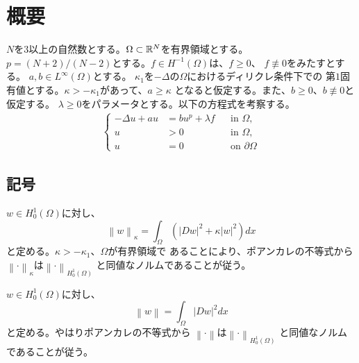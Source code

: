\section{概要}

$N$を$3$以上の自然数とする。$\Omega \subset \mathbb{R}^N$を有界領域とする。
$p = (N+2)/(N-2)$とする。$f \in H^{-1}(\Omega)$は、$f \geq 0$、
$f \not \equiv 0$をみたすとする。
$a, b \in L^\infty(\Omega)$とする。
$\kappa_1$を$-\Delta$の$\Omega$におけるディリクレ条件下での
第$1$固有値とする。$\kappa > - \kappa_1$があって、$a \geq \kappa$
となると仮定する。また、$b \geq 0$、$b \not \equiv 0$と仮定する。
$\lambda \geq 0$をパラメータとする。以下の方程式を考察する。
\begin{align}
 \left\{
 \begin{aligned}
  -\Delta u + a u &= b u^p + \lambda f  & &\text{in~} \Omega,  \\
  u &> 0 & &\text{in~} \Omega, \\
  u &= 0 & &\text{on~} \partial\Omega
 \end{aligned}
 \right. \tag*{$(\star)_\lambda$} \label{eq:prob_main}
\end{align}

\subsection{記号}

$w \in H_0^1(\Omega)$に対し、
\[
 \left\| w \right\|_\kappa = \int_\Omega \left( \lvert Dw \rvert^2 +
 \kappa \lvert w \rvert^2 \right) dx
\]
と定める。$\kappa > -\kappa_1$、$\Omega$が有界領域で
あることにより、ポアンカレの不等式から
$\left\| \cdot \right\|_\kappa$は$\left\| \cdot
\right\|_{H_0^1(\Omega)}$
と同値なノルムであることが従う。

$w \in H_0^1(\Omega)$に対し、
\[
 \left\| w \right\| = \int_\Omega \lvert Dw \rvert^2 dx
\]
と定める。やはりポアンカレの不等式から
$\left\| \cdot \right\|$は$\left\| \cdot
\right\|_{H_0^1(\Omega)}$
と同値なノルムであることが従う。
